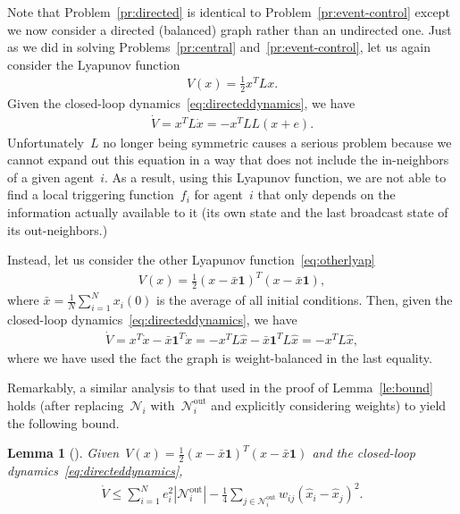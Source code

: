 \documentclass{autart}
\newtheorem{lemma}[theorem]{Lemma}
\newcommand{\NN}{{\mathcal{N}}}
\renewcommand{\hat}{\widehat}
\begin{document}
Note that Problem~\ref{pr:directed} is identical to
Problem~\ref{pr:event-control} except we now consider a directed
(balanced) graph rather than an undirected one.  Just as we did in
solving Problems~\ref{pr:central} and~\ref{pr:event-control}, let us
again consider the Lyapunov function
\begin{align*}
  V(x) = \frac{1}{2}x^T L x.
\end{align*}
Given the closed-loop dynamics~\eqref{eq:directeddynamics}, we have
\begin{align*}
  \dot{V} = x^T L \dot{x} = -x^T L L (x+e).
\end{align*}
Unfortunately~$L$ no longer being symmetric causes a serious problem
because we cannot expand out this equation in a way that does not
include the in-neighbors of a given agent~$i$. As a result, using this
Lyapunov function, we are not able to find a local triggering
function~$f_i$ for agent~$i$ that only depends on the information
actually available to it (its own state and the last broadcast state
of its out-neighbors.)

Instead, let us consider the other Lyapunov
function~\eqref{eq:otherlyap}
\begin{align}\label{eq:otherlyap2}
  V(x) = \frac{1}{2} (x - \bar{x} \mathbf{1})^T (x - \bar{x}
  \mathbf{1}) ,
\end{align}
where $\bar{x} = \frac{1}{N} \sum_{i=1}^N x_i(0)$ is the average of
all initial conditions.  Then, given the closed-loop
dynamics~\eqref{eq:directeddynamics}, we have
\begin{align*}
  \dot{V} = x^T \dot{x} - \bar{x} \mathbf{1}^T \dot{x} = - x^T L
  \hat{x} - \bar{x} \mathbf{1}^T L \hat{x} = - x^T L \hat{x},
\end{align*}
where we have used the fact the  graph is weight-balanced in the last
equality.

Remarkably, a similar analysis to that used in the proof of
Lemma~\ref{le:bound} holds (after replacing~$\NN_i$
with~$\NN_i^\text{out}$ and explicitly considering weights) to yield
the following bound.

\begin{lemma}[\citep{CN-JC:16-auto}]\label{lemma:bound}
  Given~$V(x) =
  \frac{1}{2}(x-\bar{x}\mathbf{1})^T(x-\bar{x}\mathbf{1})$
  and the closed-loop dynamics~\eqref{eq:directeddynamics},
  \begin{align*}
    \dot{V} \leq \sum_{i=1}^N e_i^2 |\NN_i^\text{out}| - \frac{1}{4}
    \sum_{j \in \NN_i^\text{out}}  w_{ij} (\hat{x}_i-\hat{x}_j)^2 .  
  \end{align*}
\end{lemma}
\end{document}
